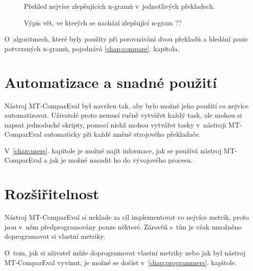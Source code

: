 	\begin{figure}
		\caption{Přehled nejvíce zlepšujících \mbox{n-gramů} v~jednotlivých překladech.}
		\label{img:confirmed_ngrams}
	\end{figure}

	\begin{figure}
		\caption{Výpis vět, ve kterých se nachází zlepšující \mbox{n-gram} ??}
		\label{img:filtered_sentences}
	\end{figure}

	O~algoritmech,
	  které byly použity při porovnávání dvou překladů a hledání pozic potvrzených \mbox{n-gramů},
  pojednává \ref{chap:compare}. kapitola.


\section{Automatizace a snadné použití}
Nástroj MT-ComparEval byl navržen tak,
  aby bylo možné jeho použití co nejvíce automatizovat.
Uživatelé proto nemusí ručně vytvářet každý task,
  ale mohou si napsat jednoduché skripty,
  pomocí nichž mohou vytvářet tasky v~nástroji MT-ComparEval automaticky při každé změně strojového překladače.

V~\ref{chap:users}. kapitole je možné najít informace,
  jak se používá nástroj MT-ComparEval
  a jak je možné nasadit ho do vývojového procesu.

\section{Rozšiřitelnost}
Nástroj MT-ComparEval si neklade za cíl implementovat co nejvíce metrik,
  proto jsou v~něm předprogramovány pouze některé.
Zárověň s~tím je však umožněno doprogramovat si vlastní metriky.

O~tom, jak si uživatel může doprogramovat vlastní metriky nebo jak byl nástroj MT-ComparEval vyvinut,
  je možné se dočíst v~\ref{chap:programmers}. kapitole.

